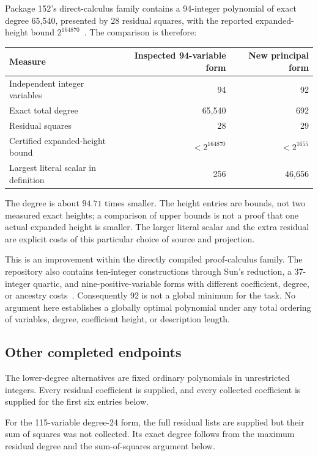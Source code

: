 \documentclass[11pt]{article}
\begin{document}
Package 152's direct-calculus family contains a 94-integer polynomial
of exact degree 65,540, presented by 28 residual squares, with the
reported expanded-height bound $2^{164870}$~\cite{p152}.
The comparison is therefore:
\begin{center}
\begin{tabular}{lrr}
\toprule
Measure & Inspected 94-variable form & New principal form\\
\midrule
Independent integer variables & 94 & 92\\
Exact total degree & 65,540 & 692\\
Residual squares & 28 & 29\\
Certified expanded-height bound & $<2^{164870}$ & $<2^{1655}$\\
Largest literal scalar in definition & 256 & 46,656\\
\bottomrule
\end{tabular}
\end{center}
The degree is about $94.71$ times smaller. The height entries are bounds,
not two measured exact heights; a comparison of upper bounds is not a
proof that one actual expanded height is smaller. The larger literal
scalar and the extra residual are explicit costs of this particular
choice of source and projection.

This is an improvement within the directly compiled proof-calculus
family. The repository also contains ten-integer constructions through
Sun's reduction, a 37-integer quartic, and nine-positive-variable forms
with different coefficient, degree, or ancestry costs~\cite{catalogue}.
Consequently 92 is not a global minimum for the task. No argument here
establishes a globally optimal polynomial under any total ordering of
variables, degree, coefficient height, or description length.

\subsection{Other completed endpoints}

The lower-degree alternatives are fixed ordinary polynomials in
unrestricted integers. Every residual coefficient is supplied, and every
collected coefficient is supplied for the first six entries below.

For the 115-variable degree-24 form, the full residual lists are supplied
but their sum of squares was not collected. Its exact degree follows
from the maximum residual degree and the sum-of-squares argument below.
\end{document}

